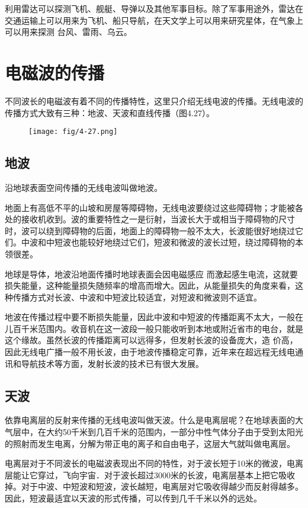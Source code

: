 利用雷达可以探测飞机、舰艇、导弹以及其他军事目标。除了军事用途外，雷达在交通运输上可以用来为飞机、船只导航，在天文学上可以用来研究星体，在气象上可以用来探测
台风、雷雨、乌云。

\section{电磁波的传播}
不同波长的电磁波有着不同的传播特性，这里只介绍无线电波的传播。无线电波的传播方式大致有三种：地波、天波和直线传播（图4.27）。
\begin{figure}[htp]\centering
	\texttt{[image: fig/4-27.png]}
	\caption{}
	\end{figure}

\subsection{地波}

沿地球表面空间传播的无线电波叫做地波。

地面上有高低不平的山坡和房屋等障碍物，无线电波要绕过这些障碍物；才能被各处的接收机收到。波的重要特性之一是衍射，当波长大于或相当于障碍物的尺寸时，波可以绕到障碍物的后面，地面上的障碍物一般不太大，长波能很好地绕过它们。中波和中短波也能较好地绕过它们，短波和微波的波长过短，绕过障碍物的本领很差。

地球是导体，地波沿地面传播时地球表面会因电磁感应
而激起感生电流，这就要损失能量，这种能量损失随频率的增高而增大。因此，从能量损失的角度来看，这种传播方式对长波、中波和中短波比较适宜，对短波和微波则不适宜。

地波在传播过程中要不断损失能量，因此中波和中短波的传播距离不太大，一般在儿百千米范围内。收音机在这一波段一般只能收听到本地或附近省市的电台，就是这个缘故。虽然长波的传播距离可以远得多，但发射长波的设备庞大，造
价高，因此无线电广播一般不用长波，由于地波传播稳定可靠，近年来在超远程无线电通讯和导航技术等方面，发射长波的技术已有很大发展。

\subsection{天波}

依靠电离层的反射来传播的无线电波叫做天波。什么是电离层呢？在地球表面的大气层中，在大约50千米到几百千米的范围内，一部分中性气体分子由于受到太阳光的照射而发生电离，分解为带正电的离子和自由电子，这层大气就叫做电离层。

电离层对于不同波长的电磁波表现出不同的特性，对于波长短于10米的微波，电离层能让它穿过，飞向宇宙．对于波长超过3000米的长波，电离层基本上把它吸收掉。对于中波、中短波和短波，波长越短，电离层对它吸收得越少而反射得越多。因此，短波最适宜以天波的形式传播，可以传到几千千米以外的远处。

